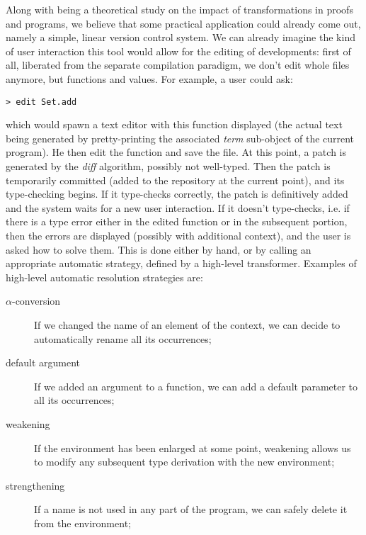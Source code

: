 \documentclass[twoside,a4paper,12pt]{article}
\begin{document}
Along with being a theoretical study on the impact of transformations
in proofs and programs, we believe that some practical application
could already come out, namely a simple, linear version control
system. We can already imagine the kind of user interaction this tool
would allow for the editing of developments: first of all, liberated
from the separate compilation paradigm, we don't edit whole files
anymore, but functions and values. For example, a user could ask:
\begin{verbatim}
> edit Set.add
\end{verbatim}
which would spawn a text editor with this function displayed (the
actual text being generated by pretty-printing the associated
\emph{term} sub-object of the current program). He then edit the
function and save the file. At this point, a patch is generated by the
\emph{diff} algorithm, possibly not well-typed. Then the patch is
temporarily committed (added to the repository at the current point),
and its type-checking begins. If it type-checks correctly, the patch
is definitively added and the system waits for a new user interaction.
If it doesn't type-checks, i.e. if there is a type error either in the
edited function or in the subsequent portion, then the errors are
displayed (possibly with additional context), and the user is asked
how to solve them. This is done either by hand, or by calling an
appropriate automatic strategy, defined by a high-level
transformer. Examples of high-level automatic resolution strategies
are:
\begin{description}
\item[$\alpha$-conversion] If we changed the name of an element of the
  context, we can decide to automatically rename all its occurrences;
\item[default argument] If we added an argument to a function, we can
  add a default parameter to all its occurrences;
\item[weakening] If the environment has been enlarged at some point,
  weakening allows us to modify any subsequent type derivation with
  the new environment;
\item[strengthening] If a name is not used in any part of the program,
  we can safely delete it from the environment;
\end{description}

\vspace{1em}
\end{document}
